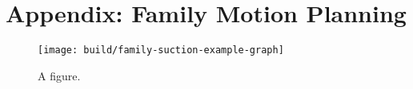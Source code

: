 \chapter{Appendix: Family Motion Planning}
\label{chap:appendix-family}

\begin{figure}
   \centering
   \texttt{[image: build/family-suction-example-graph]}
   \caption{A figure.}
   \label{fig:family:appendix-suction-example-graph}
\end{figure}
